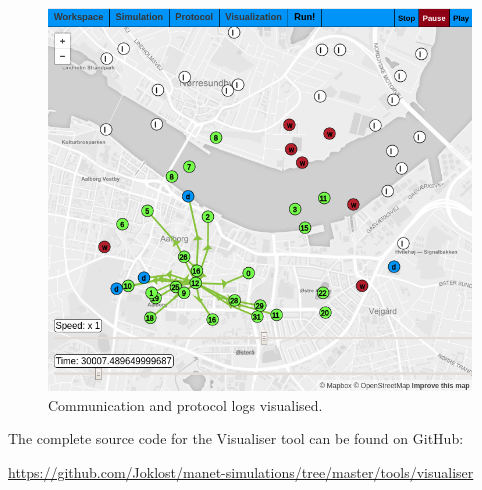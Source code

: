 \begin{figure}[H]
    \centering
    \includegraphics[width=\textwidth]{figures/visualiser/frontpage-visualisation.png}
    \caption{Communication and protocol logs visualised.}
    \label{figure:comproclogs}
\end{figure}


The complete source code for the Visualiser tool can be found on GitHub:

{\small \url{https://github.com/Joklost/manet-simulations/tree/master/tools/visualiser}}
%